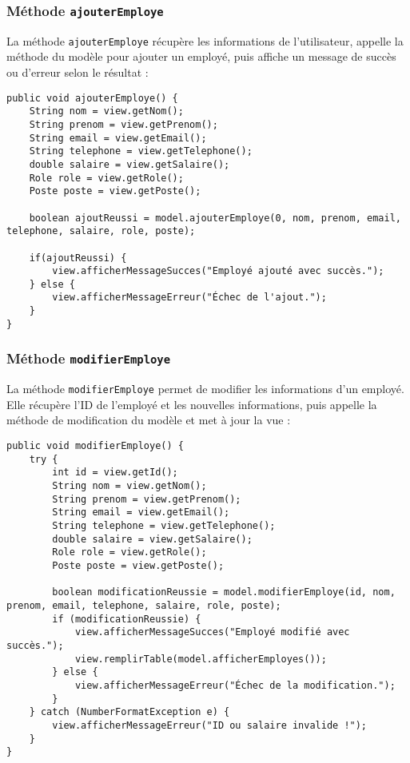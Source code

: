 \documentclass[a4paper,12pt]{report}
\begin{document}
\subsubsection{Méthode \texttt{ajouterEmploye}}
La méthode \texttt{ajouterEmploye} récupère les informations de l'utilisateur, appelle la méthode du modèle pour ajouter un employé, puis affiche un message de succès ou d'erreur selon le résultat :
\begin{verbatim}
public void ajouterEmploye() {
    String nom = view.getNom();
    String prenom = view.getPrenom();
    String email = view.getEmail();
    String telephone = view.getTelephone();
    double salaire = view.getSalaire();
    Role role = view.getRole();
    Poste poste = view.getPoste();

    boolean ajoutReussi = model.ajouterEmploye(0, nom, prenom, email, telephone, salaire, role, poste);

    if(ajoutReussi) {
        view.afficherMessageSucces("Employé ajouté avec succès.");
    } else {
        view.afficherMessageErreur("Échec de l'ajout.");
    }
}
\end{verbatim}

\subsubsection{Méthode \texttt{modifierEmploye}}
La méthode \texttt{modifierEmploye} permet de modifier les informations d'un employé. Elle récupère l'ID de l'employé et les nouvelles informations, puis appelle la méthode de modification du modèle et met à jour la vue :
\begin{verbatim}
public void modifierEmploye() {
    try {
        int id = view.getId();
        String nom = view.getNom();
        String prenom = view.getPrenom();
        String email = view.getEmail();
        String telephone = view.getTelephone();
        double salaire = view.getSalaire();
        Role role = view.getRole();
        Poste poste = view.getPoste();
        
        boolean modificationReussie = model.modifierEmploye(id, nom, prenom, email, telephone, salaire, role, poste);
        if (modificationReussie) {
            view.afficherMessageSucces("Employé modifié avec succès.");
            view.remplirTable(model.afficherEmployes());
        } else {
            view.afficherMessageErreur("Échec de la modification.");
        }
    } catch (NumberFormatException e) {
        view.afficherMessageErreur("ID ou salaire invalide !");
    }
}
\end{verbatim}
\end{document}
